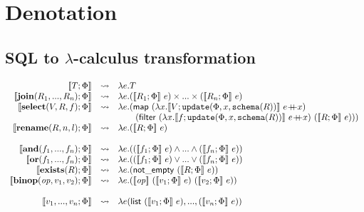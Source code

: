 
\section{Denotation}



\subsection{SQL to $\lambda$-calculus transformation}


\[
\begin{array}{rcl}
 \llbracket T; \Phi  \rrbracket& \leadsto& \lambda e.T\\
\llbracket \mathbf{join}(R_1,...,R_n);\Phi \rrbracket &\leadsto& \lambda e.(\llbracket R_1; \Phi\rrbracket~e)\times...\times(\llbracket R_n;\Phi\rrbracket~e)\\
\llbracket \mathbf{select}(V, R, f);\Phi \rrbracket &\leadsto& \lambda e. (\mathsf{map}~(\lambda x.\llbracket V;\mathtt{update}(\Phi, x, \mathtt{schema}(R)) \rrbracket~ e\concat x)\\
& & \qquad(\mathsf{filter}~(\lambda x.\llbracket f; \mathtt{update}(\Phi, x,\mathtt{schema}(R))\rrbracket~e\concat x)~ (\llbracket R;\Phi \rrbracket~e)))\\
\llbracket \mathbf{rename}(R, n, l);\Phi \rrbracket &\leadsto& \lambda e.(\llbracket R; \Phi\rrbracket~e)\\
\\
 \llbracket \mathbf{and}(f_1,...,f_n);\Phi \rrbracket &\leadsto& \lambda e.((\llbracket f_1;\Phi \rrbracket~e) \land ... \land (\llbracket f_n;\Phi \rrbracket~e))\\
\llbracket \mathbf{or}(f_1,...,f_n);\Phi \rrbracket &\leadsto& \lambda e.((\llbracket f_1;\Phi \rrbracket~e) \lor ... \lor (\llbracket f_n;\Phi \rrbracket~e))\\
\llbracket\mathbf{exists}(R);\Phi \rrbracket &\leadsto& \lambda e. (\mathsf{not\_empty}~(\llbracket R;\Phi \rrbracket~e))\\
\llbracket \mathbf{binop}(\mathit{op}, v_1, v_2);\Phi\rrbracket &\leadsto&  \lambda e.(\llbracket \mathit{op} \rrbracket~(\llbracket v_1;\Phi \rrbracket~e)~(\llbracket v_2;\Phi \rrbracket~e))\\
\\
 \llbracket v_1,...,v_n;\Phi \rrbracket & \leadsto &\lambda e(\mathsf{list}~(\llbracket v_1;\Phi\rrbracket~e),...,(\llbracket v_n;\Phi\rrbracket~e)) \\
 \\

\end{array}\]
